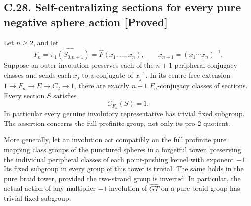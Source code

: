 \documentclass[11pt]{article}
\newcommand{\statement}[3]{\subsection*{#1. #3 [#2]}}
\begin{document}
\statement{C.28}{Proved}{Self-centralizing sections for every pure negative sphere action}
Let $n\geq2$, and let
\[
 F_n=\widehat{\pi_1(S_{0,n+1})}
   =\widehat F(x_1,\ldots,x_n),\qquad
 x_{n+1}=(x_1\cdots x_n)^{-1}.
\]
Suppose an outer involution preserves each of the $n+1$
peripheral conjugacy classes and sends each $x_j$ to a
conjugate of $x_j^{-1}$.  In its centre-free extension
$1\to F_n\to E\to C_2\to1$, there are exactly $n+1$
$F_n$-conjugacy classes of sections.  Every section
$S$ satisfies
\[
                         C_{F_n}(S)=1.                 \tag{C.28.1}
\]
In particular every genuine involutory representative has
trivial fixed subgroup.  The assertion concerns the full
profinite group, not only its pro-$2$ quotient.

More generally, let an involution act compatibly on the full
profinite pure mapping class groups of the punctured spheres
in a forgetful tower, preserving the individual peripheral
classes of each point-pushing kernel with exponent $-1$.
Its fixed subgroup in every group of this tower is trivial.
The same holds in the pure braid tower, provided the
two-strand group is inverted.  In particular, the actual
action of any multiplier-$-1$ involution of
$\widehat{GT}$ on a pure braid group has trivial fixed
subgroup.
\end{document}
